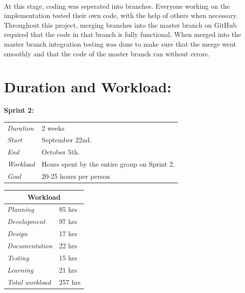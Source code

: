 \paragraph{} At this stage, coding was seperated into branches. Everyone working on the implementation tested their own code, with the help of others when necessary. Throughout this project, merging branches into the master branch on GitHub required that the code in that branch is fully functional. When merged into the master branch integration testing was done to make sure that the merge went smoothly and that the code of the master branch ran without errors.

\section{Duration and Workload:}
\label{sec:S2Duration}
\begin{minipage}{\linewidth}
\centering
\setlength{\tabcolsep}{22pt}
\textbf{Sprint 2:} 
\smallskip
{}
\begin{tabular}{ |l l| }
	\hline
	\it{Duration} & 2 weeks \\
	\it{Start} & September 22nd. \\
	\it{End} & October 5th. \\
	\it{Workload} & Hours spent by the entire group on Sprint 2. \\
	\it{Goal} & 20-25 hours per person \\
	\hline
\end{tabular}
\end{minipage}
%
\bigskip
%
\begin{minipage}{\linewidth}
\setlength{\tabcolsep}{25pt}
\centering
{}
\begin{tabular}{ |l|l| }
	\hline
	\multicolumn{2}{|c|}{\cellcolor{gray!25} Workload} \\
	\hline
	\it{Planning} & 85 hrs\\
	\it{Development} & 97 hrs \\
	\it{Design} & 17 hrs \\
	\it{Documentation} & 22 hrs \\
	\it{Testing} & 15 hrs \\
	\it{Learning} & 21 hrs \\
	\hline
	\it{Total workload} & 257 hrs \\
	\hline
\end{tabular}
\end{minipage}


